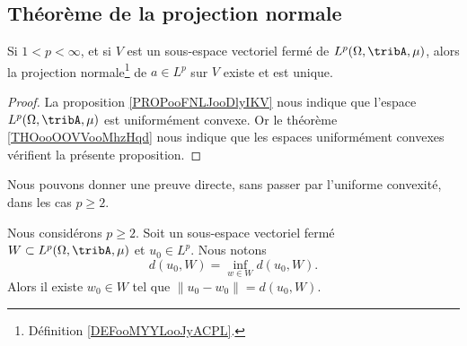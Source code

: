 \subsection{Théorème de la projection normale}

\begin{proposition}     \label{PROPooTZMRooCvQtGg}
	Si \( 1<p<\infty\), et si \( V\) est un sous-espace vectoriel fermé de \( L^p(\Omega,\tribA, \mu)\), alors la projection normale\footnote{Définition \ref{DEFooMYYLooJyACPL}.} de \( a\in L^p\) sur \( V\) existe et est unique.
\end{proposition}

\begin{proof}
	La proposition \ref{PROPooFNLJooDlyIKV} nous indique que l'espace \( L^p(\Omega,\tribA, \mu)\) est uniformément convexe. Or le théorème \ref{THOooOOVVooMhzHqd} nous indique que les espaces uniformément convexes vérifient la présente proposition.
\end{proof}

Nous pouvons donner une preuve directe, sans passer par l'uniforme convexité, dans les cas \( p\geq 2\).
\begin{theorem} \label{THOooRJFUooQivDKm}
	Nous considérons \( p\geq 2\). Soit un sous-espace vectoriel fermé \( W\subset L^p(\Omega,\tribA,\mu)\) et \( u_0\in L^p\). Nous notons
	\begin{equation}
		d(u_0,W)=\inf_{w\in W}d(u_0,W).
	\end{equation}
	Alors il existe \( w_0\in W\) tel que \( \| u_0-w_0 \|=d(u_0,W)\).
\end{theorem}


